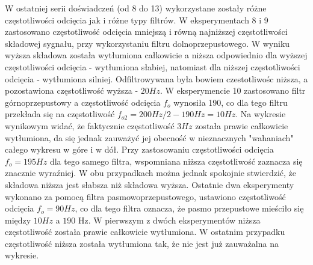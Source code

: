 \documentclass{article}
\begin{document}
{        W ostatniej serii doświadczeń (od 8 do 13) wykorzystane zostały różne
        częstotliwości odcięcia jak i różne typy filtrów. W eksperymentach 8 i 9
        zastosowano częstotliwość odcięcia mniejszą i równą najniższej częstotliwości
        składowej sygnału, przy wykorzystaniu filtru dolnoprzepustowego. W wyniku
        wyższa składowa została wytłumiona całkowicie a niższa odpowiednio dla wyższej
        częstotliwości odcięcia - wytłumiona słabiej, natomiast dla niższej
        częstotliwości odcięcia - wytłumiona silniej. Odfiltrowywana była bowiem
        czestotliwośc niższa, a pozostawiona częstotliwość wyższa - $20Hz$. W
        eksperymencie 10 zastosowano filtr górnoprzepustowy a częstotliwość odcięcia
        $f_o$ wynosiła 190, co dla tego filtru przekłada się na częstotliwość $f_{o2} =
        200Hz / 2 - 190Hz = 10Hz$. Na wykresie wynikowym widać, że faktycznie
        częstotliwość $3Hz$ została prawie całkowicie wytłumiona, da się jednak
        zauważyć jej obecność w nieznacznych "wahaniach" całego wykresu w góre i w
        dół. Przy zastosowaniu częstotliwości odcięcia $f_o = 195Hz$ dla tego samego
        filtra, wspomniana niższa częstotliwość zaznacza się znacznie wyraźniej. W obu
        przypadkach można jednak spokojnie stwierdzić, że składowa niższa jest
        słabsza niż składowa wyższa. Ostatnie dwa eksperymenty wykonano za pomocą
        filtra pasmowoprzepustowego, ustawiono częstotliwość odcięcia $f_o = 90Hz$, co
        dla tego filtra oznacza, że pasmo przepustowe mieściło się między $10Hz$ a
        $190$ Hz. W pierwszym z dwóch eksperymentów niższa częstotliwość została
        prawie całkowicie wytłumiona. W ostatnim przypadku częstotliwość niższa
        została wytłumiona tak, że nie jest już zauważalna na wykresie.
    }
\end{document}
